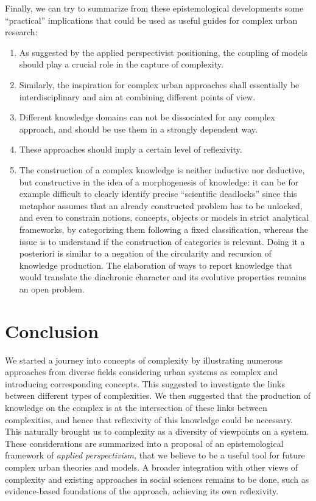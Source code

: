 \documentclass[graybox]{svmult}
\begin{document}
Finally, we can try to summarize from these epistemological developments some  ``practical'' implications that could be used as useful guides for complex urban research:

\begin{enumerate}
	\item As suggested by the applied perspectivist positioning, the coupling of models should play a crucial role in the capture of complexity.
	\item Similarly, the inspiration for complex urban approaches shall essentially be interdisciplinary and aim at combining different points of view.
	\item Different knowledge domains can not be dissociated for any complex approach, and should be use them in a strongly dependent way.
	\item These approaches should imply a certain level of reflexivity.
	\item The construction of a complex knowledge \cite{morin1991methode} is neither inductive nor deductive, but constructive in the idea of a morphogenesis of knowledge: it can be for example difficult to clearly identify precise ``scientific deadlocks'' since this metaphor assumes that an already constructed problem has to be unlocked, and even to constrain notions, concepts, objects or models in strict analytical frameworks, by categorizing them following a fixed classification, whereas the issue is to understand if the construction of categories is relevant. Doing it a posteriori is similar to a negation of the circularity and recursion of knowledge production. The elaboration of ways to report knowledge that would translate the diachronic character and its evolutive properties remains an open problem.
\end{enumerate}




\section*{Conclusion}

We started a journey into concepts of complexity by illustrating numerous approaches from diverse fields considering urban systems as complex and introducing corresponding concepts. This suggested to investigate the links between different types of complexities. We then suggested that the production of knowledge on the complex is at the intersection of these links between complexities, and hence that reflexivity of this knowledge could be necessary. This naturally brought us to complexity as a diversity of viewpoints on a system. These considerations are summarized into a proposal of an epistemological framework of \emph{applied perspectivism}, that we believe to be a useful tool for future complex urban theories and models. A broader integration with other views of complexity and existing approaches in social sciences remains to be done, such as evidence-based foundations of the approach, achieving its own reflexivity.
\end{document}

